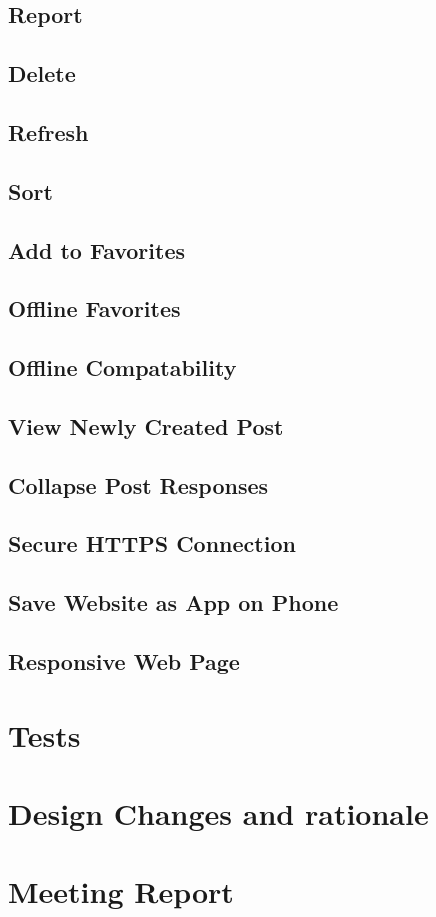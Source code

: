 \documentclass[12pt]{article}
\begin{document}
      \subsection{Report}
      \subsection{Delete}
      \subsection{Refresh}
      \subsection{Sort}
      \subsection{Add to Favorites}
      \subsection{Offline Favorites}
      \subsection{Offline Compatability}
      \subsection{View Newly Created Post}
      \subsection{Collapse Post Responses}
      \subsection{Secure HTTPS Connection}
      \subsection{Save Website as App on Phone}
      \subsection{Responsive Web Page}
\section{Tests}
\section{Design Changes and rationale}
\section{Meeting Report}
\end{document}
